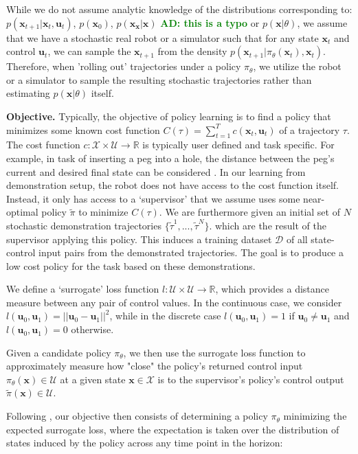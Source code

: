 \documentclass[10pt, conference]{ieeeconf}      %
\newcommand{\bu}{\mathbf{u}}
\newcommand{\bx}{\mathbf{x}}
\newcommand{\adnote}[1]{\ifthenelse{\boolean{include-notes}}%
 {\textcolor{green}{\textbf{AD: #1}}}{}}
\begin{document}
While we do not assume analytic knowledge of the distributions corresponding to: $p(\bx_{t+1}|\bx_t,\bu_t)$, $p(\bx_0)$, $p(\bx_{\bx}|
\bx)$\adnote{this is a typo} or $p(\bx|\theta)$, we assume that we have a stochastic real robot or a simulator such that for any state
$\bx_t$ and control $\bu_t$, we can sample the $\bx_{t+1}$ from the density $p(\bx_{t+1}|\pi_{\theta}(\bx_t),\bx_t)$. 
Therefore, when 'rolling out' trajectories under a policy
$\pi_{\theta}$, we utilize the robot or a simulator to sample the resulting stochastic trajectories rather than
estimating $p(\bx|\theta)$ itself.

\noindent\textbf{Objective.} Typically, the objective of policy learning is to find a policy that minimizes some known cost function
$C(\tau) = \sum^T_{t=1} c(\bx_t,\bu_t)$ of a trajectory $\tau$. The cost function $c:\mathcal{X}\times \mathcal{U}\to \mathbb{R}$ is typically user defined and task specific. 
For example, in task of inserting a peg into a hole, the distance between the peg's current and desired final state can
be considered \cite{levine2015end}.  
In our learning from demonstration setup, the robot does not have access to the cost function itself. Instead, it only has access to 
a `supervisor' that we assume uses some near-optimal policy $\tilde{\pi}$ to minimize $C(\tau)$. We are furthermore given
an initial set of $N$ stochastic demonstration trajectories $\lbrace \tilde{\tau}^1,...,\tilde{\tau}^N \rbrace$. 
which are the result of the supervisor applying this policy. This induces a training dataset $\mathcal{D}$ of all state-control input pairs from the demonstrated trajectories. The goal is to produce a low cost policy for the task based on these demonstrations.

We define a `surrogate' loss function $l:\mathcal{U}\times \mathcal{U}\to \mathbb{R}$, which provides a distance
measure between any pair of control values. In the continuous case, we consider $l(\bu_0,\bu_1) = ||\bu_0-\bu_1||^2$,
while in the discrete case $l(\bu_0,\bu_1) = 1$ if $\bu_0 \neq \bu_1$ and $l(\bu_0, \bu_1)=0$ otherwise.

Given a candidate policy $\pi_{\theta}$, we then use the surrogate loss function to approximately measure how "close" the policy's
returned control input $\pi_{\theta}(\bx)\in \mathcal{U}$ at a given state $\bx\in \mathcal{X}$ is to the supervisor's policy's control output
$\tilde{\pi}(\bx)\in \mathcal{U}$. 

Following \cite{ross2010reduction}, our objective then consists of determining a policy $\pi_{\theta}$ minimizing the expected surrogate loss, where the expectation is taken over the distribution of states induced by the policy across any time point in the horizon:
\end{document}
